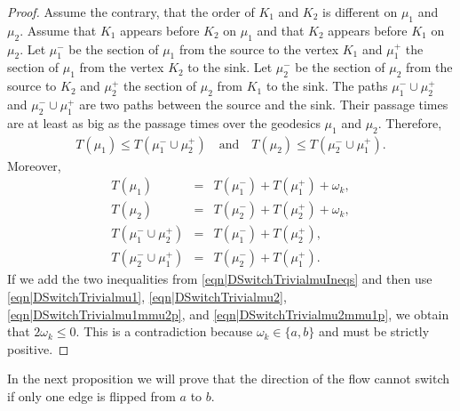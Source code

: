\documentclass[reqno]{amsart}
\begin{document}
\begin{proof}
Assume the contrary, that the order of $K_1$ and $K_2$ is different on $\mu_1$ and $\mu_2$. Assume that $K_1$ appears before $K_2$ on $\mu_1$ and that $K_2$ appears before $K_1$ on $\mu_2$. Let $\mu_1^-$ be the section of $\mu_1$ from the source to the vertex $K_1$ and $\mu_1^+$ the section of $\mu_1$ from the vertex $K_2$ to the sink. Let $\mu_2^-$ be the section of $\mu_2$ from the source to $K_2$ and $\mu_2^+$ the section of $\mu_2$ from $K_1$ to the sink. 
The paths $\mu_1^-\cup \mu_2^+$ and $\mu_2^-\cup \mu_1^+$ are two paths between the source and the sink. Their passage times are at least as big as the passage times over the geodesics $\mu_1$ and $\mu_2$. Therefore, \begin{eqnarray} T(\mu_1) \leq T(\mu_1^-\cup \mu_2^+)\quad\mbox{and}\quad T(\mu_2)\leq T(\mu_2^-\cup \mu_1^+).
\label{eqn|DSwitchTrivialmuIneqs}\end{eqnarray}
 Moreover,
\begin{eqnarray}
T(\mu_1)&=& T(\mu_1^-)+T(\mu_1^+)+\omega_k, \label{eqn|DSwitchTrivialmu1}\\ 
T(\mu_2)&=& T(\mu_2^-)+T(\mu_2^+)+\omega_k, \label{eqn|DSwitchTrivialmu2}\\
T(\mu_1^-\cup \mu_2^+)&=& T(\mu_1^-)+T(\mu_2^+), \label{eqn|DSwitchTrivialmu1mmu2p}\\
T(\mu_2^-\cup \mu_1^+)&=& T(\mu_2^-)+T(\mu_1^+). \label{eqn|DSwitchTrivialmu2mmu1p}
\end{eqnarray}
If we add the two inequalities from \eqref{eqn|DSwitchTrivialmuIneqs} and then use \eqref{eqn|DSwitchTrivialmu1}, \eqref{eqn|DSwitchTrivialmu2}, \eqref{eqn|DSwitchTrivialmu1mmu2p}, and \eqref{eqn|DSwitchTrivialmu2mmu1p}, we obtain that $2\omega_k\leq 0$. This is a contradiction because $\omega_k\in\{a,b\}$ and must be strictly positive.
\end{proof}

In the next proposition we will prove that the direction of the flow cannot switch if only one edge is flipped from $a$ to $b$. 
\end{document}
